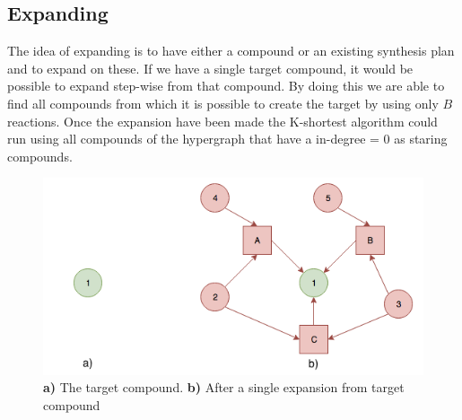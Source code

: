 \documentclass[a4paper,10pt,titlepage]{paper}
\begin{document}
\subsection{Expanding}
The idea of expanding is to have either a compound or an existing synthesis plan and to expand on these. If we have a single target compound, it would be possible to expand step-wise from that compound. By doing this we are able to find all compounds from which it is possible to create the target by using only $B$ reactions. Once the expansion have been made the K-shortest algorithm could run using all compounds of the hypergraph that have a in-degree = 0 as staring compounds.
\begin{figure}[H]
\centering
\includegraphics[scale=0.5]{Billeder/TestOfExpansion1.png}
\caption{\textbf{a)} The target compound. \textbf{b)} After a single expansion from target compound}
\end{figure} 
\end{document}
